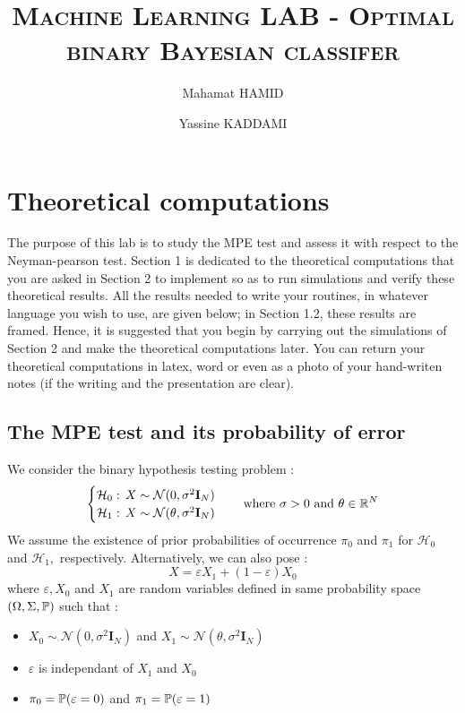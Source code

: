 \documentclass[12pt,a4paper]{article}
\title{\textsc{Machine Learning LAB - Optimal binary Bayesian classifer}}
\author{Mahamat HAMID \and Yassine KADDAMI}
\begin{document}
	\maketitle
	\section{Theoretical computations}
	The purpose of this lab is to study the MPE test and assess it with respect to the Neyman-pearson test.
Section 1 is dedicated to the theoretical computations that you are asked in Section 2 to implement so as
to run simulations and verify these theoretical results. All the results needed to write your routines, in
whatever language you wish to use, are given below; in Section 1.2, these results are framed. Hence, it is
suggested that you begin by carrying out the simulations of Section 2 and make the theoretical computations
later. You can return your theoretical computations in latex, word or even as a photo of your hand-writen
notes (if the writing and the presentation are clear).
\subsection{The MPE test and its probability of error}

We consider the binary hypothesis testing problem : 
$$ \begin{cases}
    \mathcal{H}_0 :\,  X \sim \mathcal{N}(0,\sigma^2 \textbf{I}_N) \\
    \mathcal{H}_1 :\,   X \sim \mathcal{N}(\theta,\sigma^2 \textbf{I}_N)
\end{cases} \quad \text{where }\sigma>0 \text{ and } \theta \in \mathbb{R}^N $$
 We assume the existence of prior probabilities of occurrence $\pi_0$ and $\pi_1$
for $\mathcal{H}_0$ and $\mathcal{H}_1,$ respectively. Alternatively, we can also pose : 
$$X = \varepsilon X_1 + (1-\varepsilon)X_0 $$
where $\varepsilon, X_0$ and $X_1$ are random variables defined in same probability space $(\Omega, \Sigma, \mathbb{P})$ such that :

\begin{itemize}[label = $\bullet$]
    \item $ X_0 \sim \mathcal{N}(0,\sigma^2 \textbf{I}_N) $ and $X_1 \sim \mathcal{N}(\theta,\sigma^2 \textbf{I}_N)$
    \item  $\varepsilon$ is independant of $X_1$ and  $X_0$
    \item  $\pi_0 = \mathbb{P}(\varepsilon = 0)$ and $\pi_1 =\mathbb{P}(\varepsilon = 1)$
\end{itemize}
\end{document}
